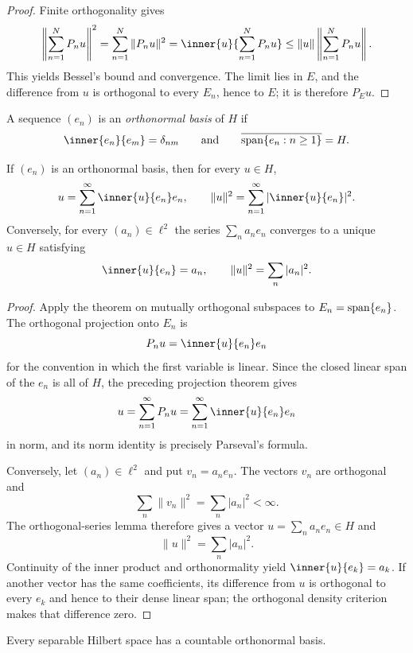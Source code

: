 \begin{proof}
Finite orthogonality gives
\[
 \left\|\sum_{n=1}^N P_nu\right\|^2
 =\sum_{n=1}^N\|P_nu\|^2
 =\inner{u}{\sum_{n=1}^N P_nu}
 \le\|u\|\left\|\sum_{n=1}^N P_nu\right\|.
\]
This yields Bessel's bound and convergence.  The limit lies in $E$, and the
difference from $u$ is orthogonal to every $E_n$, hence to $E$; it is
therefore $P_Eu$.
\end{proof}

\begin{notedefinition}
A sequence $(e_n)$ is an \emph{orthonormal basis} of $H$ if
\[
  \inner{e_n}{e_m}=\delta_{nm}
  \qquad\text{and}\qquad
  \overline{\Span\{e_n:n\ge1\}}=H.
\]
\end{notedefinition}

\begin{notetheorem}
If $(e_n)$ is an orthonormal basis, then for every $u\in H$,
\[
  u=\sum_{n=1}^{\infty}\inner{u}{e_n}e_n,
  \qquad
  \|u\|^2=\sum_{n=1}^{\infty}|\inner{u}{e_n}|^2.
\]
Conversely, for every $(a_n)\in\ell^2$ the series $\sum_na_ne_n$ converges to
a unique $u\in H$ satisfying
\[
  \inner{u}{e_n}=a_n,
  \qquad
  \|u\|^2=\sum_n|a_n|^2.
\]
\end{notetheorem}

\begin{proof}
Apply the theorem on mutually orthogonal subspaces to
$E_n=\operatorname{span}\{e_n\}$.  The orthogonal projection onto $E_n$ is
\[
  P_nu=\inner{u}{e_n}e_n
\]
for the convention in which the first variable is linear.  Since the closed
linear span of the $e_n$ is all of $H$, the preceding projection theorem gives
\[
  u=\sum_{n=1}^\infty P_nu
   =\sum_{n=1}^\infty\inner{u}{e_n}e_n
\]
in norm, and its norm identity is precisely Parseval's formula.

Conversely, let $(a_n)\in\ell^2$ and put $v_n=a_ne_n$.  The vectors $v_n$ are
orthogonal and
\[
  \sum_n\|v_n\|^2=\sum_n|a_n|^2<\infty.
\]
The orthogonal-series lemma therefore gives a vector
$u=\sum_na_ne_n\in H$ and
\[
  \|u\|^2=\sum_n|a_n|^2.
\]
Continuity of the inner product and orthonormality yield
$\inner{u}{e_k}=a_k$.  If another vector has the same coefficients, its
difference from $u$ is orthogonal to every $e_k$ and hence to their dense
linear span; the orthogonal density criterion makes that difference zero.
\end{proof}

\begin{notetheorem}
Every separable Hilbert space has a countable orthonormal basis.
\end{notetheorem}

